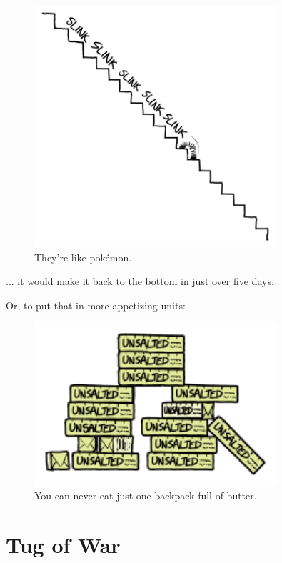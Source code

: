 {\begin{figure}[!htbp]
\centering
\includegraphics[scale=0.5, max width=0.8\textwidth]{imgs/a/126/slink.png}
\caption{They're like pokémon.}
\end{figure}

{... it would make it back to the bottom in just over five days.}

{Or, to put that in more appetizing units:}

\begin{figure}[!htbp]
\centering
\includegraphics[scale=0.5, max width=0.8\textwidth]{imgs/a/126/butter.png}
\caption{You can never eat just one backpack full of butter.}
\end{figure}

{
\chapter{Tug of War}
}

}
